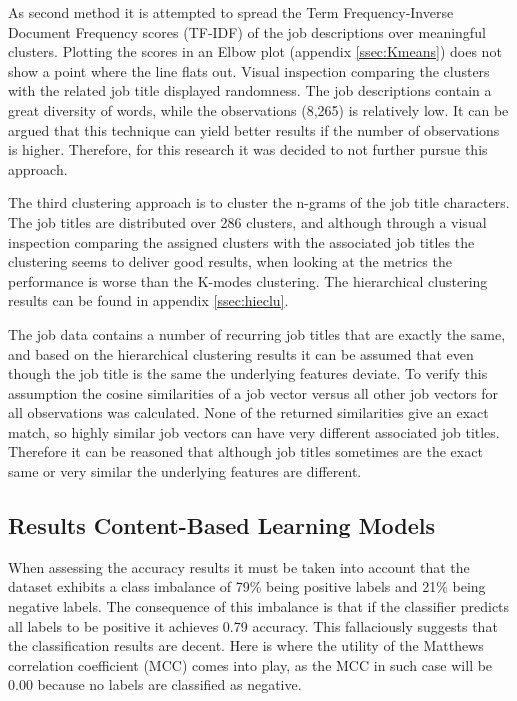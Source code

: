 As second method it is attempted to spread the Term Frequency-Inverse Document Frequency scores (TF-IDF) of the job descriptions over meaningful clusters.
Plotting the scores in an Elbow plot (appendix \ref{ssec:Kmeans}) does not show a point where the line flats out.
Visual inspection comparing the clusters with the related job title displayed randomness.
The job descriptions contain a great diversity of words, while the observations (8,265) is relatively low.
It can be argued that this technique can yield better results if the number of observations is higher. 
Therefore, for this research it was decided to not further pursue this approach.

The third clustering approach is to cluster the n-grams of the job title characters. 
The job titles are distributed over 286 clusters, and although through a visual inspection comparing the assigned clusters with the associated job titles the clustering seems to deliver good results, when looking at the metrics the performance is worse than the K-modes clustering.
The hierarchical clustering results can be found in appendix \ref{ssec:hieclu}.

The job data contains a number of recurring job titles that are exactly the same, and based on the hierarchical clustering results it can be assumed that even though the job title is the same the underlying features deviate. 
To verify this assumption the cosine similarities of a job vector versus all other job vectors for all observations was calculated.
None of the returned similarities give an exact match, so highly similar job vectors can have very different associated job titles.
Therefore it can be reasoned that although job titles sometimes are the exact same or very similar the underlying features are different.


% 

\subsection{Results Content-Based Learning Models}
When assessing the accuracy results it must be taken into account that the dataset exhibits a class imbalance of 79\% being positive labels and 21\% being negative labels.
The consequence of this imbalance is that if the classifier predicts all labels to be positive it achieves 0.79 accuracy.
This fallaciously suggests that the classification results are decent.
Here is where the utility of the Matthews correlation coefficient (MCC) comes into play, as the MCC in such case will be 0.00 because no labels are classified as negative.

